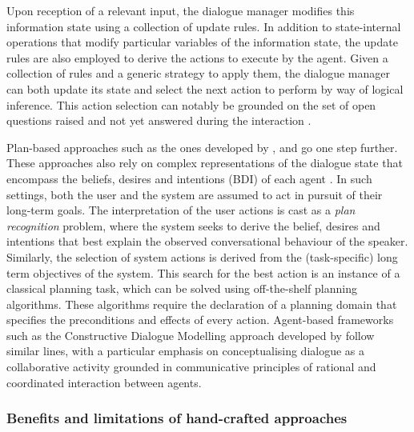 Upon reception of a relevant input, the dialogue manager modifies this information state using a collection of update rules. In addition to state-internal operations that modify particular variables of the information state, the update rules are also employed to derive the actions to execute by the agent.  Given a collection of rules and a generic strategy to apply them, the dialogue manager can both update its state and select the next action to perform by way of logical inference. This action selection can notably be grounded on the set of open questions raised and not yet answered during the interaction \citep{larsson2002,Ginzburg2012}.  

Plan-based approaches such as the ones developed by \cite{Freedman:2000}, \cite{RichSidner98umuai} and \cite{Allen:2000:AGD:973935.973937} go one step further. These approaches also rely on complex representations of the dialogue state that encompass the beliefs, desires and intentions (BDI) of each agent \citep{Cohen1979,Allen1980}.  In such settings, both the user and the system are assumed to act in pursuit of their long-term goals.  The interpretation of the user actions is cast as a \textit{plan recognition} problem, where the system seeks to derive the belief, desires and intentions that best explain the observed conversational behaviour of the speaker.  Similarly, the selection of system actions is derived from the (task-specific) long term objectives of the system. This search for the best action is an instance of a classical planning task, which can be solved using off-the-shelf planning algorithms. These algorithms require the declaration of a planning domain that specifies the preconditions and effects of every action.  Agent-based frameworks such as the Constructive Dialogue Modelling approach developed by \cite{Jokinen:2009} follow similar lines, with a particular emphasis on conceptualising dialogue as a collaborative activity grounded in communicative principles of rational and coordinated interaction between agents. 

\subsubsection*{Benefits and limitations of hand-crafted approaches}

